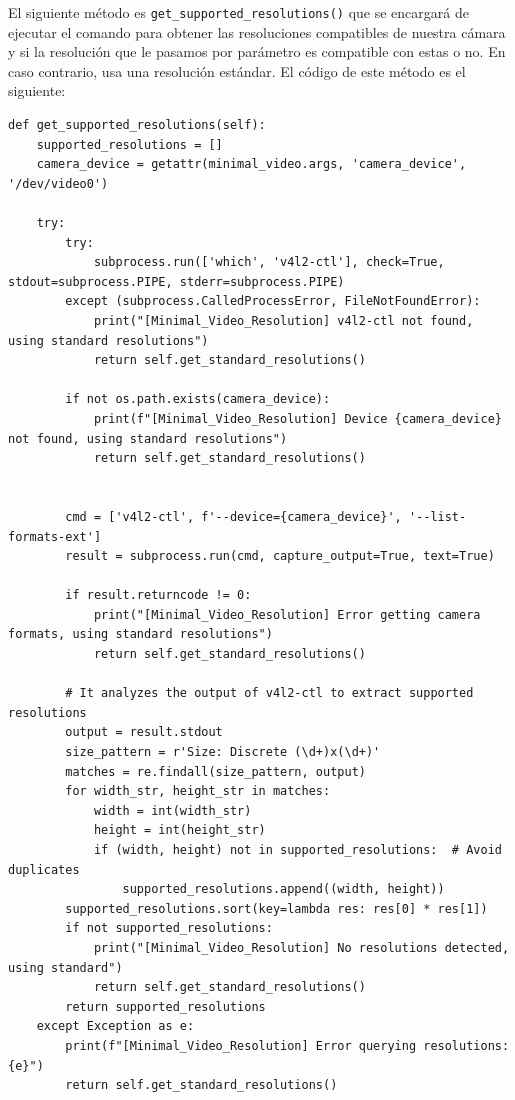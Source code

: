El siguiente método es \texttt{get\_supported\_resolutions()} que se encargará de ejecutar el comando para obtener las resoluciones compatibles de nuestra cámara y si la resolución que le pasamos por parámetro es compatible con estas o no. En caso contrario, usa una resolución estándar. El código de este método es el siguiente:
\begin{lstlisting}[style=pythonstyle, caption={\texttt{get\_supported\_resolutions()} de \textit{Minimal\_Video\_Resolution}.}, label={lst:get_supported_resolution_minimal_video_resolution}]
def get_supported_resolutions(self):
    supported_resolutions = []
    camera_device = getattr(minimal_video.args, 'camera_device', '/dev/video0')
    
    try:
        try:
            subprocess.run(['which', 'v4l2-ctl'], check=True, stdout=subprocess.PIPE, stderr=subprocess.PIPE)
        except (subprocess.CalledProcessError, FileNotFoundError):
            print("[Minimal_Video_Resolution] v4l2-ctl not found, using standard resolutions")
            return self.get_standard_resolutions()
            
        if not os.path.exists(camera_device):
            print(f"[Minimal_Video_Resolution] Device {camera_device} not found, using standard resolutions")
            return self.get_standard_resolutions()
        
        
        cmd = ['v4l2-ctl', f'--device={camera_device}', '--list-formats-ext']
        result = subprocess.run(cmd, capture_output=True, text=True)
        
        if result.returncode != 0:
            print("[Minimal_Video_Resolution] Error getting camera formats, using standard resolutions")
            return self.get_standard_resolutions()
        
        # It analyzes the output of v4l2-ctl to extract supported resolutions
        output = result.stdout
        size_pattern = r'Size: Discrete (\d+)x(\d+)'
        matches = re.findall(size_pattern, output)
        for width_str, height_str in matches:
            width = int(width_str)
            height = int(height_str)
            if (width, height) not in supported_resolutions:  # Avoid duplicates
                supported_resolutions.append((width, height))
        supported_resolutions.sort(key=lambda res: res[0] * res[1])
        if not supported_resolutions:
            print("[Minimal_Video_Resolution] No resolutions detected, using standard")
            return self.get_standard_resolutions()
        return supported_resolutions
    except Exception as e:
        print(f"[Minimal_Video_Resolution] Error querying resolutions: {e}")
        return self.get_standard_resolutions()
\end{lstlisting}
\vspace{\baselineskip}

